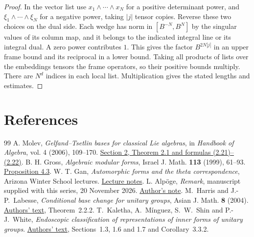 \documentclass[a4paper,11pt]{article}
\theoremstyle{definition}
\theoremstyle{remark}
\numberwithin{equation}{section}
\begin{document}
\begin{proof}
In the vector list use \(x_1\wedge\cdots\wedge x_N\) for
a positive determinant power, and
\(\xi_1\wedge\cdots\wedge\xi_N\) for a negative power,
taking \(|j|\) tensor copies. Reverse these two choices
on the dual side. Each wedge has norm in \([B^{-N},B^N]\)
by the singular values of its column map, and it belongs
to the indicated integral line or its integral dual.
A zero power contributes \(1\). This gives the factor
\(B^{2N|j|}\) in an upper frame bound and its reciprocal
in a lower bound. Taking all products of lists over the
embeddings tensors the frame operators, so their positive
bounds multiply. There are \(N^d\) indices in each local
list. Multiplication gives the stated lengths and estimates.
\end{proof}

\clearpage
\section{References}\label{nav:bibliography-XIV}
\begingroup{}\begin{thebibliography}{99}\small
{} A. Molev, \emph{Gelfand--Tsetlin bases for classical Lie algebras}, in \emph{Handbook of Algebra}, vol. 4 (2006), 109--170. \href{https://arxiv.org/abs/math/0211289}{Section 2, Theorem 2.1 and formulas (2.21)--(2.22)}.
 B. H. Gross, \emph{Algebraic modular forms}, Israel J. Math. \textbf{113} (1999), 61--93. \href{https://doi.org/10.1007/BF02780173}{Proposition 4.3}.
 W. T. Gan, \emph{Automorphic forms and the theta correspondence}, Arizona Winter School lectures. \href{https://arxiv.org/abs/2303.14918}{Lecture notes}.
 L. Alp\"oge, \emph{Remark}, manuscript supplied with this series, 20 November 2026. \href{https://alpo.ge/remark.pdf}{Author's note}.
 M.~Harris and J.-P.~Labesse, \emph{Conditional base change for unitary groups}, Asian J. Math. \textbf{8} (2004). \href{https://webusers.imj-prg.fr/~michael.harris/harlab.pdf}{Authors' text}, Theorem~2.2.2.
 T.~Kaletha, A.~M\'{i}nguez, S.~W.~Shin and P.-J.~White, \emph{Endoscopic classification of representations of inner forms of unitary groups}. \href{https://public.websites.umich.edu/kaletha/unitary.pdf}{Authors' text}, Sections~1.3, 1.6 and 1.7 and Corollary~3.3.2.
\end{thebibliography}\endgroup
\end{document}
